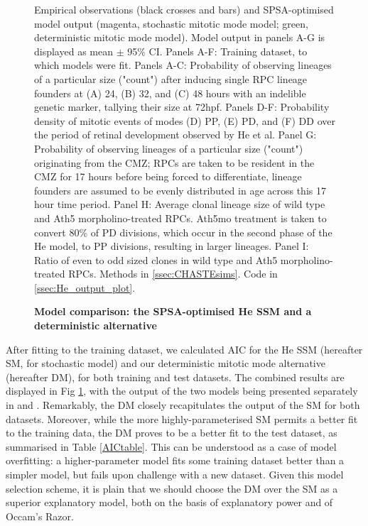 \begin{figure}[p]
\caption{{\bf Model comparison: the SPSA-optimised He SSM and a deterministic alternative}}
Empirical observations (black crosses and bars) and SPSA-optimised model output (magenta, stochastic mitotic mode model; green, deterministic mitotic mode model). Model output in panels A-G is displayed as mean $\pm$ 95\% CI. Panels A-F: Training dataset, to which models were fit. Panels A-C: Probability of observing lineages of a particular size ("count") after inducing single RPC lineage founders at (A) 24, (B) 32, and (C) 48 hours with an indelible genetic marker, tallying their size at 72hpf. Panels D-F: Probability density of mitotic events of modes (D) PP, (E) PD, and (F) DD over the period of retinal development observed by He et al. Panel G: Probability of observing lineages of a particular size ("count") originating from the CMZ; RPCs are taken to be resident in the CMZ for 17 hours before being forced to differentiate, lineage founders are assumed to be evenly distributed in age across this 17 hour time period. Panel H: Average clonal lineage size of wild type and Ath5 morpholino-treated RPCs. Ath5mo treatment is taken to convert 80\% of PD divisions, which occur in the second phase of the He model, to PP divisions, resulting in larger lineages. Panel I: Ratio of even to odd sized clones in wild type and Ath5 morpholino-treated RPCs.
Methods in \autoref{ssec:CHASTEsims}.
Code in \autoref{ssec:He_output_plot}.
\label{SDFig}
\end{figure}
\FloatBarrier

After fitting to the training dataset, we calculated AIC for the He SSM (hereafter SM, for stochastic model) and our deterministic mitotic mode alternative (hereafter DM), for both training and test datasets. The combined results are displayed in Fig \ref{SDFig}, with the output of the two models being presented separately in  and . Remarkably, the DM closely recapitulates the output of the SM for both datasets. Moreover, while the more highly-parameterised SM permits a better fit to the training data, the DM proves to be a better fit to the test dataset, as summarised in Table \ref{AICtable}. This can be understood as a case of model overfitting: a higher-parameter model fits some training dataset better than a simpler model, but fails upon challenge with a new dataset. Given this model selection scheme, it is plain that we should choose the DM over the SM as a superior explanatory model, both on the basis of explanatory power and of Occam's Razor.

